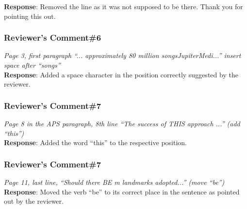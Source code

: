 \documentclass[10pt,letterpaper]{article}
\begin{document}
\noindent
\textbf{\textsf{Response}}:
Removed the line as it was not supposed to be there. Thank you for pointing this out.


\subsubsection*{\textbf{\textsf{Reviewer's Comment\#6}}}
\noindent
\emph{Page 3, first paragraph ``... approximately 80 million songsJupiterMedi...'' insert space after ``songs''}\\[6pt]

\noindent
\textbf{\textsf{Response}}:
Added a space character in the position correctly suggested by the reviewer. 


\subsubsection*{\textbf{\textsf{Reviewer's Comment\#7}}}
\noindent
\emph{Page 8 in the APS paragraph, 8th line ``The success of THIS approach ...'' (add ``this'')}\\[6pt]

\noindent
\textbf{\textsf{Response}}:
Added the word ``this'' to the respective position.


\subsubsection*{\textbf{\textsf{Reviewer's Comment\#7}}}
\noindent
\emph{Page 11, last line, ``Should there BE m landmarks adopted...'' (move ``be'')}\\[6pt]

\noindent
\textbf{\textsf{Response}}:
Moved the verb ``be'' to its correct place in the sentence as pointed out by the reviewer.
\end{document}
